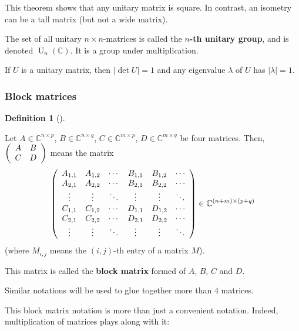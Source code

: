 \documentclass[numbers=enddot,12pt,final,onecolumn,notitlepage]{scrartcl}%
\numberwithin{exer}{subsection}
\theoremstyle{definition}
\newtheorem{defi}[theo]{Definition}
\newenvironment{definition}[1][]
{\begin{defi}[#1]\begin{leftbar}}
{\end{leftbar}\end{defi}}
\begin{document}
This theorem shows that any unitary matrix is square. In contrast, an isometry
can be a tall matrix (but not a wide matrix).

The set of all unitary $n\times n$-matrices is called the $n$\textbf{-th
unitary group}, and is denoted $\operatorname*{U}\nolimits_{n}\left(
\mathbb{C}\right)  $. It is a group under multiplication. 

If $U$ is a unitary matrix, then $\left\vert \det U\right\vert =1$ and any
eigenvalue $\lambda$ of $U$ has $\left\vert \lambda\right\vert =1$.

\subsubsection{Block matrices}

\begin{definition}
Let $A\in\mathbb{C}^{n\times p}$, $B\in\mathbb{C}^{n\times q}$, $C\in
\mathbb{C}^{m\times p}$, $D\in\mathbb{C}^{m\times q}$ be four matrices. Then,
$\left(
\begin{array}
[c]{cc}%
A & B\\
C & D
\end{array}
\right)  $ means the matrix%
\[
\left(
\begin{array}
[c]{cccccc}%
A_{1,1} & A_{1,2} & \cdots & B_{1,1} & B_{1,2} & \cdots\\
A_{2,1} & A_{2,2} & \cdots & B_{2,1} & B_{2,2} & \cdots\\
\vdots & \vdots & \ddots & \vdots & \vdots & \ddots\\
C_{1,1} & C_{1,2} & \cdots & D_{1,1} & D_{1,2} & \cdots\\
C_{2,1} & C_{2,2} & \cdots & D_{2,1} & D_{2,2} & \cdots\\
\vdots & \vdots & \ddots & \vdots & \vdots & \ddots
\end{array}
\right)  \in\mathbb{C}^{\left(  n+m\right)  \times\left(  p+q\right)  }%
\]
(where $M_{i,j}$ means the $\left(  i,j\right)  $-th entry of a matrix $M$).

This matrix is called the \textbf{block matrix} formed of $A$, $B$, $C$ and
$D$.
\end{definition}

Similar notations will be used to glue together more than $4$ matrices.

This block matrix notation is more than just a convenient notation. Indeed,
multiplication of matrices plays along with it:
\end{document}
